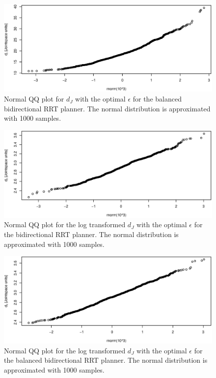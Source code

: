 \begin{figure}[h]
 \centering
 \includegraphics[width=\figsize]{graphics/qq_op_ba}
 \caption{Normal QQ plot for \(d_J\) with the optimal \(\epsilon\) for the balanced bidirectional RRT planner. The normal distribution is approximated with 1000 samples.}
 \label{fig:balanced_qq}
\end{figure}

\begin{figure}[h]
 \centering
 \includegraphics[width=\figsize]{graphics/qq_tran_op_bi}
 \caption{Normal QQ plot for the log transformed \(d_J\) with the optimal \(\epsilon\) for the bidirectional RRT planner. The normal distribution is approximated with 1000 samples.}
 \label{fig:bidir_log_qq}
\end{figure}

\begin{figure}[h]
 \centering
 \includegraphics[width=\figsize]{graphics/qq_tran_op_ba}
 \caption{Normal QQ plot for the log transformed \(d_J\) with the optimal \(\epsilon\) for the balanced bidirectional RRT planner. The normal distribution is approximated with 1000 samples.}
 \label{fig:balanced_log_qq}
\end{figure}



